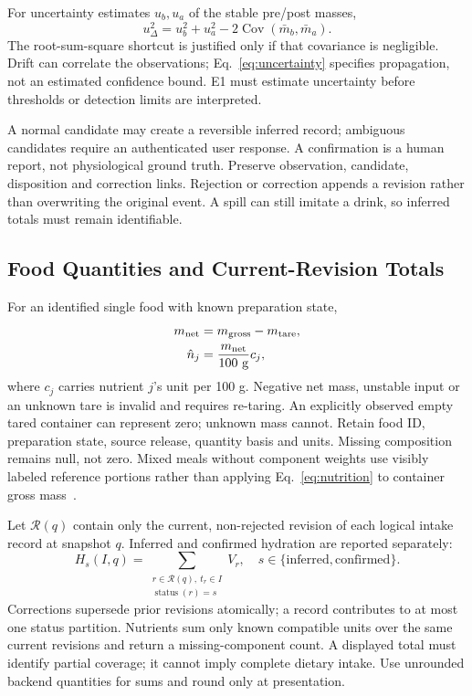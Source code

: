

For uncertainty estimates $u_b,u_a$ of the stable pre/post masses,
\begin{equation}u_{\Delta}^2=u_b^2+u_a^2-2\operatorname{Cov}(\bar m_b,\bar m_a).
\label{eq:uncertainty}\end{equation}
The root-sum-square shortcut is justified only if that covariance is negligible. Drift can correlate the observations; Eq.~\eqref{eq:uncertainty} specifies propagation, not an estimated confidence bound. E1 must estimate uncertainty before thresholds or detection limits are interpreted.

A normal candidate may create a reversible inferred record; ambiguous candidates require an authenticated user response. A confirmation is a human report, not physiological ground truth. Preserve observation, candidate, disposition and correction links. Rejection or correction appends a revision rather than overwriting the original event. A spill can still imitate a drink, so inferred totals must remain identifiable.

\subsection{Food Quantities and Current-Revision Totals}
For an identified single food with known preparation state,
\begin{equation}\begin{aligned}
m_{\rm net}&=m_{\rm gross}-m_{\rm tare},\\
\hat n_j&=\frac{m_{\rm net}}{100\ {\rm g}}c_j,
\end{aligned}\label{eq:nutrition}\end{equation}
where $c_j$ carries nutrient $j$'s unit per 100 g. Negative net mass, unstable input or an unknown tare is invalid and requires re-taring. An explicitly observed empty tared container can represent zero; unknown mass cannot. Retain food ID, preparation state, source release, quantity basis and units. Missing composition remains null, not zero. Mixed meals without component weights use visibly labeled reference portions rather than applying Eq.~\eqref{eq:nutrition} to container gross mass~\cite{usda}.

Let $\mathcal R(q)$ contain only the current, non-rejected revision of each logical intake record at snapshot $q$. Inferred and confirmed hydration are reported separately:
\begin{equation}H_s(I,q)=\sum_{\substack{r\in\mathcal R(q),\ t_r\in I\\\operatorname{status}(r)=s}} V_r,
\quad s\in\{\mathrm{inferred},\mathrm{confirmed}\}.\label{eq:totals}\end{equation}
Corrections supersede prior revisions atomically; a record contributes to at most one status partition. Nutrients sum only known compatible units over the same current revisions and return a missing-component count. A displayed total must identify partial coverage; it cannot imply complete dietary intake. Use unrounded backend quantities for sums and round only at presentation.

